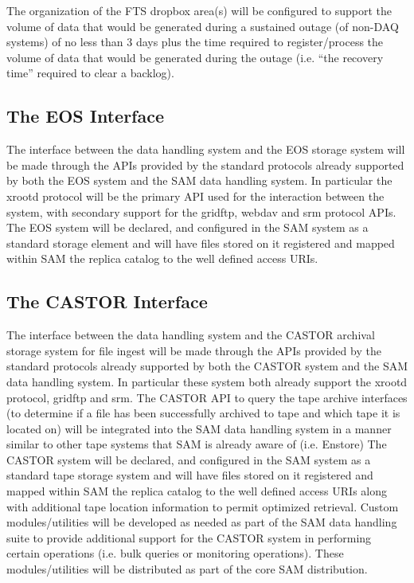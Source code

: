 \documentclass[pdftex,12pt,letter]{article}
\begin{document}
The organization of the FTS dropbox area(s) will be configured to support the volume of data that would be generated during a
sustained outage (of non-DAQ systems) of no less than 3 days plus the time required to register/process the volume of data
that would be generated during the outage (i.e. ``the recovery time'' required to clear a backlog).

\subsection{The EOS Interface}
The interface between the data handling system and the EOS storage system will be made through the APIs
provided by the standard protocols already supported by both the EOS system and the SAM data handling system.
In particular the xrootd protocol will be the primary API used for the interaction between the system, with secondary
support for the gridftp, webdav and srm protocol APIs.  The EOS system will be declared, and configured in the SAM
system as a standard storage element and will have files stored on it registered and mapped within SAM the replica
catalog to the well defined access URIs. 

\subsection{The CASTOR Interface}
The interface between the data handling system and the CASTOR archival storage system for file ingest will be made through the APIs provided by the standard protocols already supported by both the CASTOR system and the SAM data handling system.  In particular these system both already support the xrootd protocol, gridftp and srm.  The CASTOR API to query the tape archive interfaces (to determine if a file has been successfully archived to tape and which tape it is located on) will be integrated into the SAM data handling system in a manner similar to other tape systems that SAM is already aware of (i.e. Enstore)   The CASTOR system will be declared, and configured in the SAM system as a standard tape storage system and will have files stored on it registered and mapped within SAM the replica catalog to the well defined access URIs along with additional tape location information to permit optimized retrieval.  Custom modules/utilities will be developed as needed as part of the SAM data handling suite to provide additional support for the CASTOR system in performing certain operations (i.e. bulk queries or monitoring operations).  These modules/utilities will be distributed as part of the core SAM distribution.
\end{document}
